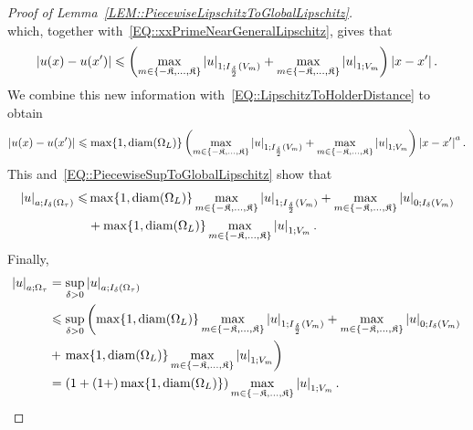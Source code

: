 \documentclass[12pt,a4paper]{amsart}
\makeatletter
\numberwithin{equation}{section}
\theoremstyle{definition}
\theoremstyle{remark}
\newcommand{\abs}[1]{\left\lvert#1\right\rvert}
\renewcommand{\leq}{\leqslant}
\newcommand{\constapp}[1]{%
  \csname constapp@#1\endcsname%
}
\makeatother
\begin{document}
\begin{appendix}
\begin{proof}[Proof of Lemma~\ref{LEM::PiecewiseLipschitzToGlobalLipschitz}]
\begin{equation}
    \end{equation}
    which, together with~\eqref{EQ::xxPrimeNearGeneralLipschitz}, gives that
    \begin{equation}\label{EQ::LipschitzEstimateNegativeB}
        |u(x)-u(x^\prime)| \leq \left(\max_{m \in \{-\mathfrak{K},\dots,\mathfrak{K}\}} \abs{u}_{1; I_{\frac{\delta}{2}}(V_m)} + \constapp{CONST::Quasiconvexity} \max_{m \in \{-\mathfrak{K},\dots,\mathfrak{K}\}}\abs{u}_{1; V_{m}}\right)\abs{x-x^\prime}.
    \end{equation}
    We combine this new information with~\eqref{EQ::LipschitzToHolderDistance} to obtain
    \begin{equation}
        |u(x)-u(x^\prime)| \leq \max\{1,\operatorname{diam}(\Omega_L)\}\left(\max_{m \in \{-\mathfrak{K},\dots,\mathfrak{K}\}} \abs{u}_{1; I_{\frac{\delta}{2}}(V_m)} + \constapp{CONST::Quasiconvexity} \max_{m \in \{-\mathfrak{K},\dots,\mathfrak{K}\}}\abs{u}_{1; V_{m}}\right)\abs{x-x^\prime}^a.
    \end{equation}
    This and~\eqref{EQ::PiecewiseSupToGlobalLipschitz} show that
    \begin{equation}\begin{split}
            \abs{u}_{a; I_\delta(\Omega_\tau)} \leq &\max\{1,\operatorname{diam}(\Omega_L)\}\max_{m \in \{-\mathfrak{K},\dots,\mathfrak{K}\}} \abs{u}_{1; I_{\frac{\delta}{2}}(V_m)} + \max_{m \in \{-\mathfrak{K},\dots,\mathfrak{K}\}}\abs{u}_{0;I_\delta(V_m)}\\
                &+ \constapp{CONST::Quasiconvexity} \max\{1,\operatorname{diam}(\Omega_L)\}\max_{m \in \{-\mathfrak{K},\dots,\mathfrak{K}\}}\abs{u}_{1; V_{m}}.
        \end{split}
    \end{equation}
    Finally,
    \begin{equation}\label{EQ::HolderStitchingBetaLipschitz}
        \begin{split}
            \abs{u}_{a; \Omega_\tau} &= \sup_{\delta > 0} \abs{u}_{a; I_\delta(\Omega_\tau)}\\
                &\leq \sup_{\delta > 0}\left(\max\{1,\operatorname{diam}(\Omega_L)\}\max_{m \in \{-\mathfrak{K},\dots,\mathfrak{K}\}} \abs{u}_{1; I_{\frac{\delta}{2}}(V_m)} + \max_{m \in \{-\mathfrak{K},\dots,\mathfrak{K}\}}\abs{u}_{0;I_\delta(V_m)}\right.\\
                &+ \left.\constapp{CONST::Quasiconvexity} \max\{1,\operatorname{diam}(\Omega_L)\}\max_{m \in \{-\mathfrak{K},\dots,\mathfrak{K}\}}\abs{u}_{1; V_{m}}\right)\\
                &= \left(1+(1+\constapp{CONST::Quasiconvexity}) \max\{1,\operatorname{diam}(\Omega_L)\}\right)\max_{m \in \{-\mathfrak{K},\dots,\mathfrak{K}\}}\abs{u}_{1; V_{m}}.
        \end{split}
    \end{equation}


\end{proof}
\end{appendix}
\end{document}
